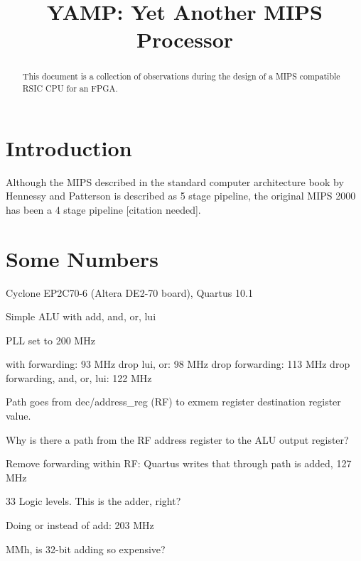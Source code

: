 \documentclass[conference]{IEEEtran}
\newcommand{\todo}[1]{\emph{TODO: #1}}
\begin{document}
\title{YAMP: Yet Another MIPS Processor}

\author{
}



\maketitle \thispagestyle{empty}


\begin{abstract}

This document is a collection of observations during the design of a MIPS
compatible RSIC CPU for an FPGA.
\end{abstract}


\section{Introduction}

Although the MIPS described in the standard computer architecture book by
Hennessy and Patterson is described as 5 stage pipeline, the original MIPS
2000 has been a 4 stage pipeline [citation needed].

\section{Some Numbers}

Cyclone EP2C70-6 (Altera DE2-70 board), Quartus 10.1

Simple ALU with add, and, or, lui

PLL set to 200 MHz

with forwarding: 93 MHz
drop lui, or: 98 MHz
drop forwarding: 113 MHz
drop forwarding, and, or, lui: 122 MHz

Path goes from dec/address\_reg (RF) to exmem register destination register value.

Why is there a path from the RF address register to the ALU output register?

Remove forwarding within RF: Quartus writes that through path is added, 127 MHz

33 Logic levels. This is the adder, right?

Doing or instead of add: 203 MHz

MMh, is 32-bit adding so expensive?

%
%
%



\end{document}
